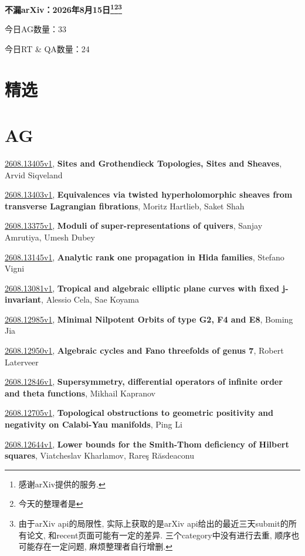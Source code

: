 \documentclass[9pt, a4paper]{article}
\theoremstyle{plain}
\theoremstyle{definition}
\theoremstyle{remark}
\newcommand{\arxiv}[3]{\href{https://arxiv.org/abs/#1}{#1}, \textbf{\textcolor{arxivblue}{#2}}, #3}
\newcommand{\AGnumber}{33}
\newcommand{\RTQAnumber}{24}
\newcommand{\NewestDate}{2026年8月15日}
\newcommand{\todayarXiver}{} %
\begin{document}
\begin{center}
    \Huge\textbf{不漏arXiv：\NewestDate\footnote{感谢arXiv提供的服务.}\footnote{今天的整理者是\todayarXiver}\footnote{由于arXiv api的局限性, 实际上获取的是arXiv api给出的最近三天submit的所有论文, 和recent页面可能有一定的差异. 三个category中没有进行去重, 顺序也可能存在一定问题, 麻烦整理者自行增删.}} \\
\end{center}

\setcounter{section}{-1}

\begin{center}
    今日AG数量：\AGnumber
    
    今日RT \& QA数量：\RTQAnumber
    
\end{center}


\section{精选}


\section{AG}
\arxiv{2608.13405v1}{Sites and Grothendieck Topologies, Sites and Sheaves}{Arvid Siqveland}

\arxiv{2608.13403v1}{Equivalences via twisted hyperholomorphic sheaves from transverse Lagrangian fibrations}{Moritz Hartlieb, Saket Shah}

\arxiv{2608.13375v1}{Moduli of super-representations of quivers}{Sanjay Amrutiya, Umesh Dubey}

\arxiv{2608.13145v1}{Analytic rank one propagation in Hida families}{Stefano Vigni}

\arxiv{2608.13081v1}{Tropical and algebraic elliptic plane curves with fixed j-invariant}{Alessio Cela, Sae Koyama}

\arxiv{2608.12985v1}{Minimal Nilpotent Orbits of type G2, F4 and E8}{Boming Jia}

\arxiv{2608.12950v1}{Algebraic cycles and Fano threefolds of genus 7}{Robert Laterveer}

\arxiv{2608.12846v1}{Supersymmetry, differential operators of infinite order and theta functions}{Mikhail Kapranov}

\arxiv{2608.12705v1}{Topological obstructions to geometric positivity and negativity on Calabi-Yau manifolds}{Ping Li}

\arxiv{2608.12644v1}{Lower bounds for the Smith-Thom deficiency of Hilbert squares}{Viatcheslav Kharlamov, Rareş Răsdeaconu}
\end{document}

